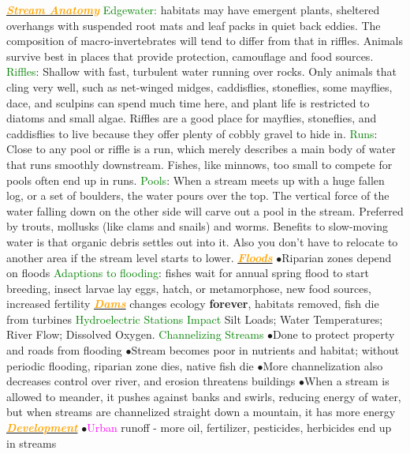 \documentclass{article}
\newcommand{\ddd}{$\bullet$}
\newcommand{\green}[1]{\textcolor{green}{#1}}
\newcommand{\pink}[1]{\textcolor{magenta}{#1}}
\newcommand{\orange}[1]{\textcolor{orange}{#1}}
\newcommand{\mysubsection}[1]{\underline{\textbf{{\textit{\orange{#1}}}}}}
\newcommand{\mysubsub}[1]{{{\green{#1}}}}
\newcommand{\vocab}[1]{{\pink{#1}}}
\begin{document}
\begin{multicols*}{4}
        \mysubsection{Stream Anatomy} 
        	\mysubsub{Edgewater: } habitats may have emergent plants, sheltered overhangs with suspended root mats and leaf packs in quiet back eddies. The composition of macro-invertebrates will tend to differ from that in riffles. Animals survive best in places that provide protection, camouflage and food sources.         	
        	\mysubsub{Riffles}: Shallow with fast, turbulent water running over rocks. Only animals that cling very well, such as net-winged midges, caddisflies, stoneflies, some mayflies, dace, and sculpins can spend much time here, and plant life is restricted to diatoms and small algae. Riffles are a good place for mayflies, stoneflies, and caddisflies to live because they offer plenty of cobbly gravel to hide in.
        	\mysubsub{Runs}: Close to any pool or riffle is a run, which merely describes a main body of water that runs smoothly downstream. Fishes, like minnows, too small to compete for pools often end up in runs.
        	\mysubsub{Pools}: When a stream meets up with a huge fallen log, or a set of boulders, the water pours over the top. The vertical force of the water falling down on the other side will carve out a pool in the stream. Preferred by trouts, mollusks (like clams and snails) and worms. Benefits to slow-moving water is that organic debris settles out into it. Also you don't have to relocate to another area if the stream level starts to lower.
        \mysubsection{Floods}
            \ddd Riparian zones depend on floods
            \mysubsub{Adaptions to flooding}: fishes wait for annual spring flood to start breeding, insect larvae lay eggs, hatch, or metamorphose, new food sources, increased fertility
        \mysubsection{Dams}
            changes ecology \textbf{forever}, habitats removed, fish die from turbines
            \mysubsub{Hydroelectric Stations Impact}
                Silt Loads; Water Temperatures; River Flow; Dissolved Oxygen. 
            \mysubsub{Channelizing Streams}
                \ddd Done to protect property and roads from flooding
                \ddd Stream becomes poor in nutrients and habitat; without periodic flooding, riparian zone dies, native fish die
                \ddd More channelization also decreases control over river, and erosion threatens buildings
                \ddd When a stream is allowed to meander, it pushes against banks and swirls, reducing energy of water, but when streams are channelized straight down a mountain, it has more energy
        \mysubsection{Development}
            \ddd \vocab{Urban} runoff - more oil, fertilizer, pesticides, herbicides end up in streams

\end{multicols*}
\end{document}
